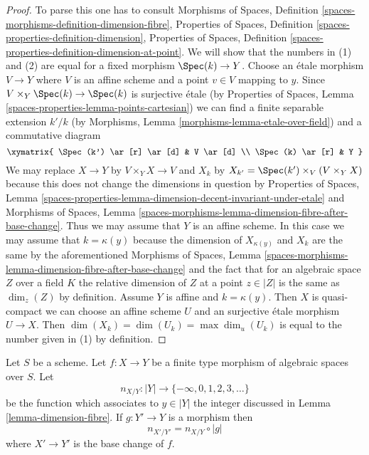 \begin{proof}
To parse this one has to consult
Morphisms of Spaces, Definition
\ref{spaces-morphisms-definition-dimension-fibre},
Properties of Spaces,
Definition \ref{spaces-properties-definition-dimension},
Properties of Spaces,
Definition \ref{spaces-properties-definition-dimension-at-point}.
We will show that the numbers in (1) and (2) are equal for
a fixed morphism $\Spec(k) \to Y$.
Choose an \'etale morphism $V \to Y$ where $V$ is an affine
scheme and a point $v \in V$ mapping to $y$.
Since $V \times_Y \Spec(k) \to \Spec(k)$ is surjective \'etale
(by Properties of Spaces, Lemma \ref{spaces-properties-lemma-points-cartesian})
we can find a finite separable extension $k'/k$
(by Morphisms, Lemma \ref{morphisms-lemma-etale-over-field})
and a commutative diagram
$$
\xymatrix{
\Spec(k') \ar[r] \ar[d] & V \ar[d] \\
\Spec(k) \ar[r] & Y
}
$$
We may replace $X \to Y$ by $V \times_Y X \to V$ and
$X_k$ by $X_{k'} = \Spec(k') \times_V (V \times_Y X)$
because this does not change the dimensions in question by
Properties of Spaces, Lemma
\ref{spaces-properties-lemma-dimension-decent-invariant-under-etale}
and Morphisms of Spaces, Lemma
\ref{spaces-morphisms-lemma-dimension-fibre-after-base-change}.
Thus we may assume that $Y$ is an affine scheme.
In this case we may assume that $k = \kappa(y)$
because the dimension of $X_{\kappa(y)}$ and $X_k$
are the same by the aforementioned Morphisms of Spaces, Lemma
\ref{spaces-morphisms-lemma-dimension-fibre-after-base-change}
and the fact that for an algebraic space $Z$ over a field $K$ the
relative dimension of $Z$ at a point $z \in |Z|$
is the same as $\dim_z(Z)$ by definition.
Assume $Y$ is affine and $k = \kappa(y)$. Then
$X$ is quasi-compact we can choose an affine scheme $U$ and
an surjective \'etale morphism $U \to X$.
Then $\dim(X_k) = \dim(U_k) = \max \dim_u(U_k)$
is equal to the number given in (1) by definition.
\end{proof}

\begin{lemma}
\label{lemma-base-change-dimension-fibres}
Let $S$ be a scheme. Let $f : X \to Y$ be a finite type morphism of
algebraic spaces over $S$. Let
$$
n_{X/Y} : |Y| \to \{-\infty, 0, 1, 2, 3, \ldots\}
$$
be the function which associates to $y \in |Y|$ the
integer discussed in Lemma \ref{lemma-dimension-fibre}.
If $g : Y' \to Y$ is a morphism then
$$
n_{X'/Y'} = n_{X/Y} \circ |g|
$$
where $X' \to Y'$ is the base change of $f$.
\end{lemma}

